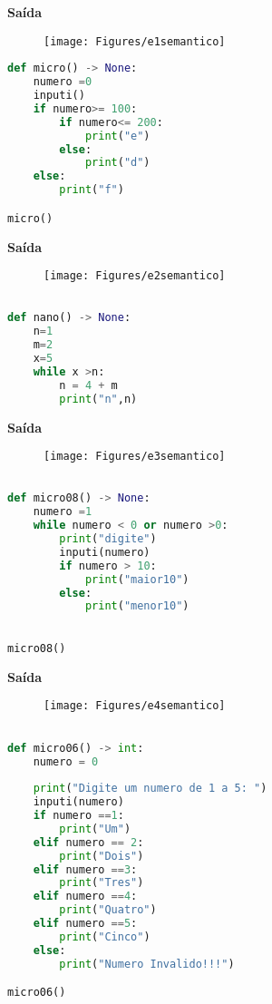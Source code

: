 \documentclass[hidelinks,12pt]{article}
\begin{document}
	
	\textbf{{\large Saída}}
	
	\begin{figure}[!h]
		\centering
		\texttt{[image: Figures/e1semantico]}
	\end{figure}
	
	\newpage
\begin{lstlisting}[caption=sintatico.mli, language=python]
def micro() -> None: 
	numero =0
	inputi()
	if numero>= 100:
		if numero<= 200:
			print("e")
		else:
			print("d")
	else:
		print("f")

micro()

\end{lstlisting}


\textbf{{\large Saída}}

\begin{figure}[!h]
	\centering
	\texttt{[image: Figures/e2semantico]}
\end{figure}

\begin{lstlisting}[caption=sintatico.mli, language=python]

def nano() -> None:
	n=1
	m=2
	x=5
	while x >n:
		n = 4 + m
		print("n",n)


\end{lstlisting}


\textbf{{\large Saída}}

\begin{figure}[!h]
	\centering
	\texttt{[image: Figures/e3semantico]}
\end{figure}

\newpage
\begin{lstlisting}[caption=sintatico.mli, language=python]

def micro08() -> None:
	numero =1
	while numero < 0 or numero >0:
		print("digite")
		inputi(numero)
		if numero > 10:
			print("maior10")
		else:
			print("menor10")
	

micro08()

\end{lstlisting}


\textbf{{\large Saída}}

\begin{figure}[!h]
	\centering
	\texttt{[image: Figures/e4semantico]}
\end{figure}

\newpage
\begin{lstlisting}[caption=sintatico.mli, language=python]

def micro06() -> int:
	numero = 0
	
	print("Digite um numero de 1 a 5: ")
	inputi(numero)
	if numero ==1: 
		print("Um")
	elif numero == 2:
		print("Dois")
	elif numero ==3:
		print("Tres")
	elif numero ==4:
		print("Quatro")
	elif numero ==5:
		print("Cinco")
	else:
		print("Numero Invalido!!!")

micro06()

\end{lstlisting}
\end{document}
